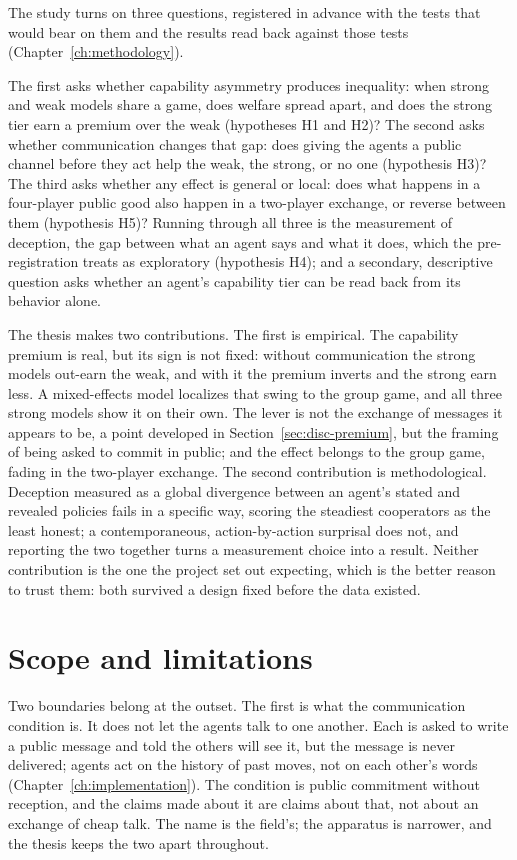 The study turns on three questions, registered in advance with the tests that would bear on them
and the results read back against those tests (Chapter~\ref{ch:methodology}).

The first asks whether capability asymmetry produces inequality: when strong and weak models share
a game, does welfare spread apart, and does the strong tier earn a premium over the weak
(hypotheses H1 and H2)? The second asks whether communication changes that gap: does giving the
agents a public channel before they act help the weak, the strong, or no one (hypothesis H3)? The
third asks whether any effect is general or local: does what happens in a four-player public good
also happen in a two-player exchange, or reverse between them (hypothesis H5)? Running through all
three is the measurement of deception, the gap between what an agent says and what it does, which
the pre-registration treats as exploratory (hypothesis H4); and a secondary, descriptive question
asks whether an agent's capability tier can be read back from its behavior alone.

The thesis makes two contributions. The first is empirical. The capability premium is real, but its
sign is not fixed: without communication the strong models out-earn the weak, and with it the
premium inverts and the strong earn less. A mixed-effects model localizes that swing to the group
game, and all three strong models show it on their own. The lever is not the exchange of messages
it appears to be, a point developed in Section~\ref{sec:disc-premium}, but the framing of being
asked to commit in public; and the effect belongs to the group game, fading in the two-player
exchange. The second contribution is methodological. Deception measured as a global divergence
between an agent's stated and revealed policies fails in a specific way, scoring the steadiest
cooperators as the least honest; a contemporaneous, action-by-action surprisal does not, and
reporting the two together turns a measurement choice into a result. Neither contribution is the one
the project set out expecting, which is the better reason to trust them: both survived a design
fixed before the data existed.

\section{Scope and limitations}
\label{sec:intro-scope}

Two boundaries belong at the outset. The first is what the communication condition is. It does not
let the agents talk to one another. Each is asked to write a public message and told the others
will see it, but the message is never delivered; agents act on the history of past moves, not on
each other's words (Chapter~\ref{ch:implementation}). The condition is public commitment without
reception, and the claims made about it are claims about that, not about an exchange of cheap talk.
The name is the field's; the apparatus is narrower, and the thesis keeps the two apart throughout.

